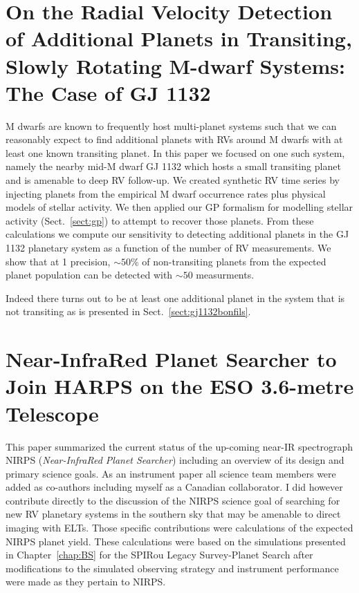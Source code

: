 \section{On the Radial Velocity Detection of Additional Planets in Transiting,
  Slowly Rotating M-dwarf Systems: The Case of GJ 1132 \citep{cloutier17a}}
M dwarfs are known to frequently host multi-planet systems such that we can
reasonably expect to find additional planets with RVs around M dwarfs with at
least one known transiting planet. In this paper we focused on one such
system, namely the nearby mid-M dwarf GJ 1132 which hosts a small transiting
planet and is amenable to deep RV follow-up. We created synthetic RV time series
by injecting planets from the empirical M dwarf occurrence rates plus physical
models of stellar activity. We then applied our GP formalism for modelling
stellar activity (Sect.~\ref{sect:gp}) to attempt to recover those planets.
From these calculations we compute our sensitivity to detecting additional
planets in the GJ 1132 planetary system as a function of the number of RV
measurements. We show that at 1 \mps{} precision, $\sim 50$\% of non-transiting
planets from the expected planet population can be detected with $\sim 50$
measurments.

Indeed there turns out to be at least one additional planet in the system that
is not transiting as is presented in Sect.~\ref{sect:gj1132bonfils}.

\section{Near-InfraRed Planet Searcher to Join HARPS on the ESO 3.6-metre
  Telescope \citep{bouchy17}}
This paper summarized the current status of the up-coming near-IR spectrograph
NIRPS (\emph{Near-InfraRed Planet Searcher}) including an overview of its design
and primary science goals. As an instrument paper all science team members were
added as co-authors including myself as a Canadian collaborator. I did however
contribute directly to the discussion of the NIRPS science goal of searching
for new RV planetary systems in the southern sky that may be amenable to direct
imaging with ELTs. Those specific contributions were calculations of the
expected NIRPS planet yield. These calculations were based on the simulations
presented in Chapter~\ref{chap:BS} for the
SPIRou Legacy Survey-Planet Search after modifications to the simulated
observing strategy and instrument performance were made as they pertain to
NIRPS.


